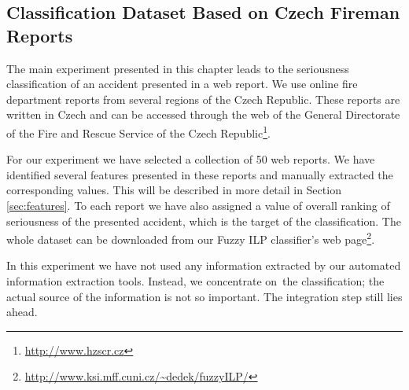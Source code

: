 \subsection{Classification Dataset Based on Czech Fireman Reports} \label{sec:ch40_classify_fireman}


The main experiment presented in this chapter leads to the seriousness classification of an accident presented in a web report. %
We use online fire department reports from several regions of the Czech Republic. These reports are written in Czech and can be accessed through the web of the General Directorate of the Fire and Rescue Service of the Czech Republic\footnote{\url{http://www.hzscr.cz}}. 

For our experiment we have selected a collection of 50 web reports. We have identified several features presented in these reports and manually extracted the corresponding values. This will be described in more detail in Section \ref{sec:features}. To each report we have also assigned a value of overall ranking of seriousness of the presented accident, which is the target of the classification. The whole dataset can be downloaded from our Fuzzy ILP classifier's web page\footnote{\url{http://www.ksi.mff.cuni.cz/~dedek/fuzzyILP/}}.

In this experiment we have not used any information extracted by our automated information extraction tools. Instead, we concentrate on~the classification; the actual source of the information is not so important. The integration step still lies ahead.





